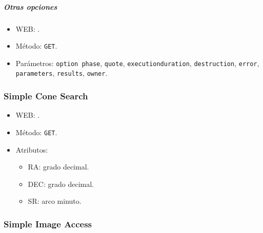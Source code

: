 \subparagraph{Otras opciones}

\begin{itemize}
	\item WEB: \url{}.
	\item M\'etodo: \verb;GET;.
	\item Parámetros: \verb;option phase;, \verb;quote;, \verb;executionduration;, \verb;destruction;, \verb;error;, \verb;parameters;, \verb;results;, \verb;owner;.
\end{itemize}

\subsubsection*{{\sc Simple Cone Search}}

\begin{itemize}
	\item WEB: \url{}.
	\item M\'etodo: \verb;GET;.
	\item Atributos: 
		\begin{itemize}
			\item RA: grado decimal.
			\item DEC: grado decimal.
			\item SR: arco minuto.
		\end{itemize}
\end{itemize}

\subsubsection*{{\sc Simple Image Access}}

